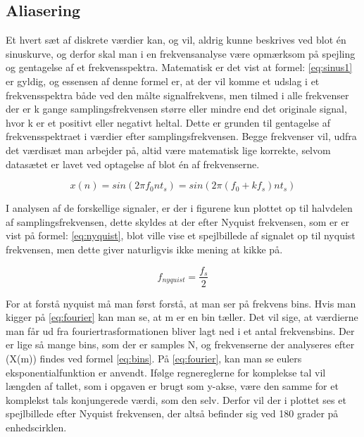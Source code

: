 \subsection{Aliasering}
Et hvert sæt af diskrete værdier kan, og vil, aldrig kunne beskrives ved blot én sinuskurve, og derfor skal man i en frekvensanalyse være opmærksom på spejling og gentagelse af et frekvensspektra. Matematisk er det vist at formel: \eqref{eq:sinus1} er gyldig, og essensen af denne formel er, at der vil komme et udslag i et frekvensspektra både ved den målte signalfrekvens, men tilmed i alle frekvenser der er k gange samplingsfrekvensen større eller mindre end det originale signal, hvor k er et positivt eller negativt heltal. Dette er grunden til gentagelse af frekvensspektraet i værdier efter samplingsfrekvensen. Begge frekvenser vil, udfra det værdisæt man arbejder på, altid være matematisk lige korrekte, selvom datasætet er lavet ved optagelse af blot én af frekvenserne.

\begin{equation}\label{eq:sinus1}
{x(n)} = sin(2\pi f_0 n t_s) =sin(2\pi (f_0+kf_s) n t_s) 
\end{equation}

  
I analysen af de forskellige signaler, er der i figurene kun plottet op til halvdelen af samplingsfrekvensen, dette skyldes at der efter Nyquist frekvensen, som er er vist på formel: \eqref{eq:nyquist}, blot ville vise et spejlbillede af signalet op til nyquist frekvensen, men dette giver naturligvis ikke mening at kikke på.
 
  \begin{equation}\label{eq:nyquist}
  f_{nyquist} = \frac{f_s}{2} 
  \end{equation}

For at forstå nyquist må man først forstå, at man ser på frekvens bins. Hvis man kigger på \eqref{eq:fourier} kan man se, at m er en bin tæller. Det vil sige, at værdierne man får ud fra fouriertrasformationen bliver lagt ned i et antal frekvensbins. Der er lige så mange bins, som der er samples N, og frekvenserne der analyseres efter (X(m)) findes ved formel \eqref{eq:bins}. På \eqref{eq:fourier}, kan man se eulers eksponentialfunktion er anvendt. Ifølge regnereglerne for komplekse tal vil længden af tallet, som i opgaven er brugt som y-akse, være den samme for et komplekst tals konjungerede værdi, som den selv. Derfor vil der i plottet ses et spejlbillede efter Nyquist frekvensen, der altså befinder sig ved 180 grader på enhedscirklen.  
 
